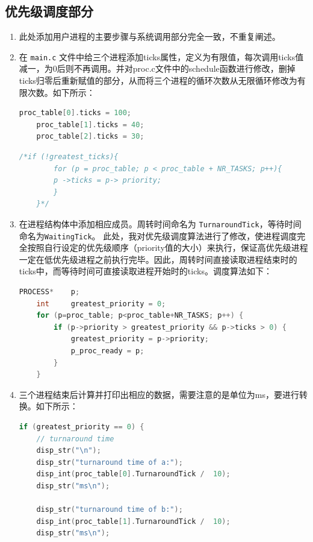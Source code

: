 \subsection{优先级调度部分}
\begin{enumerate}
        \item 此处添加用户进程的主要步骤与系统调用部分完全一致，不重复阐述。
        
        \item 在 \texttt{main.c} 文件中给三个进程添加ticks属性，定义为有限值，每次调用ticks值减一，为0后则不再调用。并对proc.c文件中的schedule函数进行修改，删掉ticks归零后重新赋值的部分，从而将三个进程的循环次数从无限循环修改为有限次数。如下所示：
\begin{lstlisting}[language = C]
    proc_table[0].ticks = 100;
    proc_table[1].ticks = 40;
    proc_table[2].ticks = 30;
\end{lstlisting}

\begin{lstlisting}[language = C]
    /*if (!greatest_ticks){
        for (p = proc_table; p < proc_table + NR_TASKS; p++){
        p ->ticks = p-> priority;
        }
    }*/
\end{lstlisting}
        
        \item 在进程结构体中添加相应成员。周转时间命名为 \texttt{TurnaroundTick}，等待时间命名为\texttt{WaitingTick}。
        此处，我对优先级调度算法进行了修改，使进程调度完全按照自行设定的优先级顺序（priority值的大小）来执行，保证高优先级进程一定在低优先级进程之前执行完毕。因此，周转时间直接读取进程结束时的ticks中，而等待时间可直接读取进程开始时的ticks。调度算法如下：
\begin{lstlisting}[language = C]
    PROCESS*	p;
    int		greatest_priority = 0;
    for (p=proc_table; p<proc_table+NR_TASKS; p++) {
		if (p->priority > greatest_priority && p->ticks > 0) {
			greatest_priority = p->priority;
			p_proc_ready = p;
		}
    }
\end{lstlisting}
        
        \item 三个进程结束后计算并打印出相应的数据，需要注意的是单位为ms，要进行转换。如下所示：
\begin{lstlisting}[language = C]
if (greatest_priority == 0) {
    // turnaround time
    disp_str("\n");
    disp_str("turnaround time of a:");
    disp_int(proc_table[0].TurnaroundTick /  10);
    disp_str("ms\n");

    disp_str("turnaround time of b:");
    disp_int(proc_table[1].TurnaroundTick /  10);
    disp_str("ms\n");


\end{lstlisting}
\end{enumerate}
